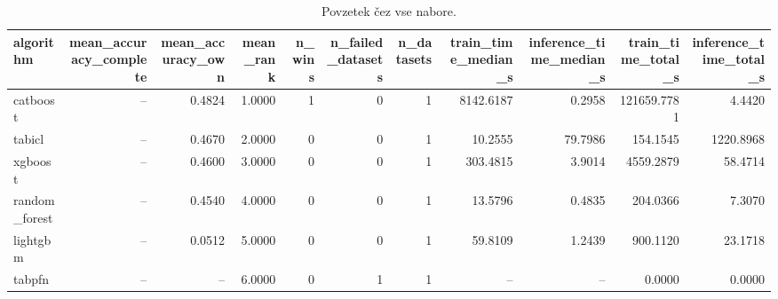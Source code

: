 \begin{table}[htbp]
\centering
\caption{Povzetek čez vse nabore.}
\label{tab:overall}
\begin{tabular}{lrrrrrrrrrr}
\hline
algorithm & mean\_accuracy\_complete & mean\_accuracy\_own & mean\_rank & n\_wins & n\_failed\_datasets & n\_datasets & train\_time\_median\_s & inference\_time\_median\_s & train\_time\_total\_s & inference\_time\_total\_s \\
\hline
catboost & -- & 0.4824 & 1.0000 & 1 & 0 & 1 & 8142.6187 & 0.2958 & 121659.7781 & 4.4420 \\
tabicl & -- & 0.4670 & 2.0000 & 0 & 0 & 1 & 10.2555 & 79.7986 & 154.1545 & 1220.8968 \\
xgboost & -- & 0.4600 & 3.0000 & 0 & 0 & 1 & 303.4815 & 3.9014 & 4559.2879 & 58.4714 \\
random\_forest & -- & 0.4540 & 4.0000 & 0 & 0 & 1 & 13.5796 & 0.4835 & 204.0366 & 7.3070 \\
lightgbm & -- & 0.0512 & 5.0000 & 0 & 0 & 1 & 59.8109 & 1.2439 & 900.1120 & 23.1718 \\
tabpfn & -- & -- & 6.0000 & 0 & 1 & 1 & -- & -- & 0.0000 & 0.0000 \\
\hline
\end{tabular}
\end{table}

